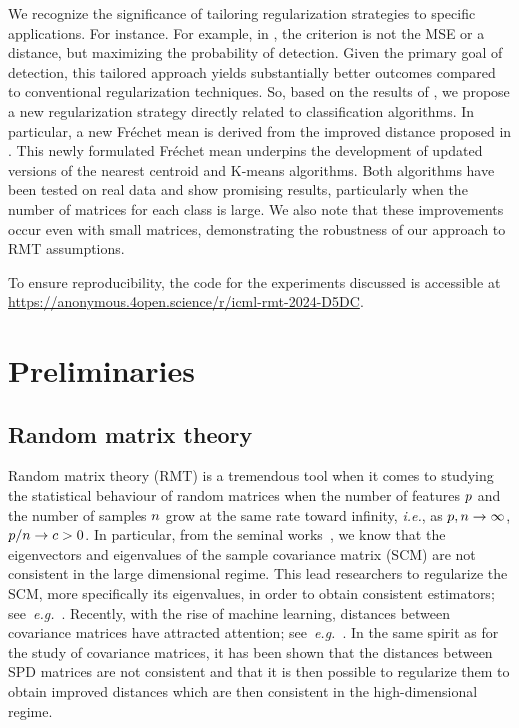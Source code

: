 \documentclass{article}
\theoremstyle{plain}
\theoremstyle{definition}
\theoremstyle{remark}
\begin{document}
We recognize the significance of tailoring regularization strategies to specific applications. For instance. For example, in \cite{Kammoun2017}, the criterion is not the MSE or a distance, but maximizing the probability of detection. Given the primary goal of detection, this tailored approach yields substantially better outcomes compared to conventional regularization techniques. So, based on the results of \cite{couillet2019random,tiomoko2019random}, we propose a new regularization strategy directly related to classification algorithms. In particular, a new Fréchet mean is derived from the improved distance proposed in \cite{couillet2019random}. This newly formulated Fréchet mean underpins the development of updated versions of the nearest centroid and K-means algorithms. Both algorithms have been tested on real data and show promising results, particularly when the number of matrices for each class is large. We also note that these improvements occur even with small matrices, demonstrating the robustness of our approach to RMT assumptions. 

To ensure reproducibility, the code for the experiments discussed is accessible at \url{https://anonymous.4open.science/r/icml-rmt-2024-D5DC}.

\section{Preliminaries}

\subsection{Random matrix theory}
Random matrix theory (RMT) is a tremendous tool when it comes to studying the statistical behaviour of random matrices when the number of features $p$ and the number of samples $n$ grow at the same rate toward infinity, \emph{i.e.}, as $p,n\to\infty$, $p/n\to c>0$.
In particular, from the seminal works~\cite{wishart1928generalised, marchenko1967distribution, silverstein1995empirical}, we know that the eigenvectors and eigenvalues of the sample covariance matrix (SCM) are not consistent in the large dimensional regime.
This lead researchers to regularize the SCM, more specifically its eigenvalues, in order to obtain consistent estimators; see~\emph{e.g.}~\cite{ledoit2015spectrum, ledoit2018optimal}.
Recently, with the rise of machine learning, distances between covariance matrices have attracted attention; see~\emph{e.g.}~\cite{couillet2019random, couillet2022random}. In the same spirit as for the study of covariance matrices, it has been shown that the distances between SPD matrices are not consistent and that it is then possible to regularize them to obtain improved distances which are then consistent in the high-dimensional regime.
\end{document}
